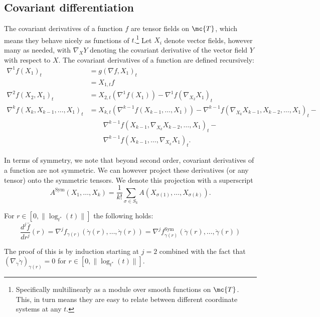 \documentclass{article}
\begin{document}
\subsection{Covariant differentiation}

The covariant derivatives of a function $f$ are tensor fields on $\mc{T}$, which means they behave nicely
as functions of $t$.\footnote{Specifically multilinearly as a module over smooth functions on $\mc{T}$. This,
in turn means they are easy to relate between different coordinate systems at any $t$.}
Let $X_i$ denote vector fields, however many as needed, with $\nabla_XY$ denoting
the covariant derivative of the vector field $Y$ with respect to $X$. The covariant
derivatives of a function are defined recursively:
$$
\begin{aligned}
  \nabla^1 f(X_1)_t &= g(\nabla f, X_1)_t \\
  &= X_{1,t}f \\
  \nabla^2 f(X_2, X_1)_t &= X_{2,t}(\nabla^1 f(X_1)) - \nabla^1 f(\nabla_{X_2}X_1)_t \\
  \nabla^k f(X_k, X_{k-1}, \dots, X_1)_t &= X_{k,t}(\nabla^{k-1} f(X_{k-1}, \dots, X_1)) -
  \nabla^{k-1} f(\nabla_{X_k}X_{k-1}, X_{k-2}, \dots, X_1)_t - \\
&  \qquad   \nabla^{k-1} f(X_{k-1}, \nabla_{X_k}X_{k-2}, \dots, X_1)_t - \\
  & \qquad \nabla^{k-1} f(X_{k-1}, \dots, \nabla_{X_k}X_1)_t.
  \end{aligned}
$$

In terms of symmetry, we note that beyond second order, covariant derivatives of a function are not symmetric. We can however project these derivatives
(or any tensor) 
onto the symmetric tensors. We denote this projection with a superscript
$$
A^{\mathrm{Sym}}(X_1, \dots, X_k) = \frac{1}{k!} \sum_{\sigma \in S_k} A(X_{\sigma(1)}, \dots, X_{\sigma(k)}).
$$

\begin{lemma}
\label{lem:geodesic}
  For $r \in [0, \|\log_{t^*}(t)\|]$ the following holds:
  $$
\frac{d^j\bar{f}}{dr^j}(r) = \nabla^j f_{\gamma(r)}(\dot{\gamma}(r), \dots, \dot{\gamma}(r)) =  \nabla^j f_{\gamma(r)}^{\mathrm{Sym}}(\dot{\gamma}(r), \dots, \dot{\gamma}(r))
  $$
  \end{lemma}
The proof of this is by induction starting at $j=2$ combined with the fact that $(\nabla_{\dot{\gamma}}\dot{\gamma})_{\gamma(r)}=0$ for $r \in [0, \|\log_{t^*}(t)\|]$.
\end{document}
